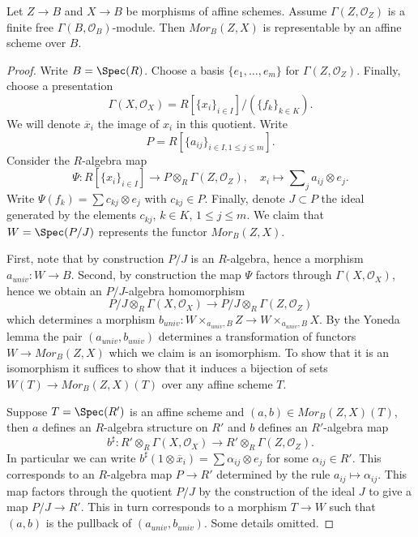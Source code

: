 \begin{lemma}
\label{lemma-hom-from-finite-free-into-affine}
Let $Z \to B$ and $X \to B$ be morphisms of affine schemes.
Assume $\Gamma(Z, \mathcal{O}_Z)$ is a finite free
$\Gamma(B, \mathcal{O}_B)$-module. Then $\mathit{Mor}_B(Z, X)$
is representable by an affine scheme over $B$.
\end{lemma}

\begin{proof}
Write $B = \Spec(R)$. Choose a basis $\{e_1, \ldots, e_m\}$
for $\Gamma(Z, \mathcal{O}_Z)$. Finally, choose a presentation
$$
\Gamma(X, \mathcal{O}_X) = R[\{x_i\}_{i \in I}]/(\{f_k\}_{k \in K}).
$$
We will denote $\overline{x}_i$ the image of $x_i$ in this quotient.
Write
$$
P = R[\{a_{ij}\}_{i \in I, 1 \leq j \leq m}].
$$
Consider the $R$-algebra map
$$
\Psi :
R[\{x_i\}_{i \in I}]
\longrightarrow
P \otimes_R \Gamma(Z, \mathcal{O}_Z), \quad
x_i \longmapsto \sum\nolimits_j a_{ij} \otimes e_j.
$$
Write $\Psi(f_k) = \sum c_{kj} \otimes e_j$ with $c_{kj} \in P$.
Finally, denote $J \subset P$ the ideal generated by the elements
$c_{kj}$, $k \in K$, $1 \leq j \leq m$. We claim that
$W = \Spec(P/J)$ represents the functor $\mathit{Mor}_B(Z, X)$.

\medskip\noindent
First, note that by construction $P/J$ is an $R$-algebra, hence
a morphism $a_{univ} : W \to B$. Second, by construction the map
$\Psi$ factors through $\Gamma(X, \mathcal{O}_X)$, hence we obtain
an $P/J$-algebra homomorphism
$$
P/J \otimes_R \Gamma(X, \mathcal{O}_X)
\longrightarrow
P/J \otimes_R \Gamma(Z, \mathcal{O}_Z)
$$
which determines a morphism
$b_{univ} : W \times_{a_{univ}, B} Z \to W \times_{a_{univ}, B} X$.
By the Yoneda lemma the pair $(a_{univ}, b_{univ})$ determines a
transformation of functors $W \to \mathit{Mor}_B(Z, X)$ which we
claim is an isomorphism. To show that it is an isomorphism it suffices
to show that it induces a bijection of sets
$W(T) \to \mathit{Mor}_B(Z, X)(T)$ over any affine
scheme $T$.

\medskip\noindent
Suppose $T = \Spec(R')$ is an affine scheme
and $(a, b) \in \mathit{Mor}_B(Z, X)(T)$, then $a$ defines an
$R$-algebra structure on $R'$ and $b$ defines an $R'$-algebra map
$$
b^\sharp :
R' \otimes_R \Gamma(X, \mathcal{O}_X)
\longrightarrow
R' \otimes_R \Gamma(Z, \mathcal{O}_Z).
$$
In particular we can write
$b^\sharp(1 \otimes \overline{x}_i) = \sum \alpha_{ij} \otimes e_j$
for some $\alpha_{ij} \in R'$. This corresponds to an $R$-algebra map
$P \to R'$ determined by the rule $a_{ij} \mapsto \alpha_{ij}$. This
map factors through the quotient $P/J$ by the construction of the ideal
$J$ to give a map $P/J \to R'$. This in turn corresponds to a morphism
$T \to W$ such that $(a, b)$ is the pullback of $(a_{univ}, b_{univ})$.
Some details omitted.
\end{proof}

